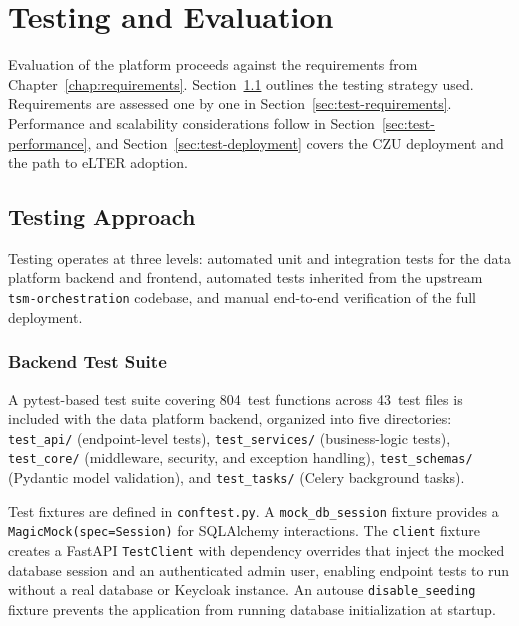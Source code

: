 \chapter{Testing and Evaluation}
\label{chap:testing}

Evaluation of the platform proceeds against the requirements from Chapter~\ref{chap:requirements}.
Section~\ref{sec:test-approach} outlines the testing strategy used. Requirements
are assessed one by one in Section~\ref{sec:test-requirements}. Performance and scalability
considerations follow in Section~\ref{sec:test-performance}, and Section~\ref{sec:test-deployment}
covers the CZU deployment and the path to eLTER adoption.

\section{Testing Approach}
\label{sec:test-approach}

Testing operates at three levels: automated unit and integration tests for the
data platform backend and frontend, automated tests inherited from the upstream
\texttt{tsm-orchestration} codebase, and manual end-to-end verification of the full
deployment.

\subsection{Backend Test Suite}
\label{sec:test-approach-backend}

A pytest-based test suite covering 804~test
functions across 43~test files is included with the data platform backend, organized into five directories:
\texttt{test\_api/} (endpoint-level tests), \texttt{test\_services/} (business-logic tests),
\texttt{test\_core/} (middleware, security, and exception handling), \texttt{test\_schemas/}
(Pydantic model validation), and \texttt{test\_tasks/} (Celery background tasks).

Test fixtures are defined in \texttt{conftest.py}. A \texttt{mock\_db\_session} fixture
provides a \texttt{MagicMock(spec=Session)} for SQLAlchemy interactions. The \texttt{client}
fixture creates a FastAPI \texttt{TestClient} with dependency overrides that inject the mocked
database session and an authenticated admin user, enabling endpoint tests to run without a
real database or Keycloak instance. An autouse \texttt{disable\_seeding} fixture prevents
the application from running database initialization at startup.

